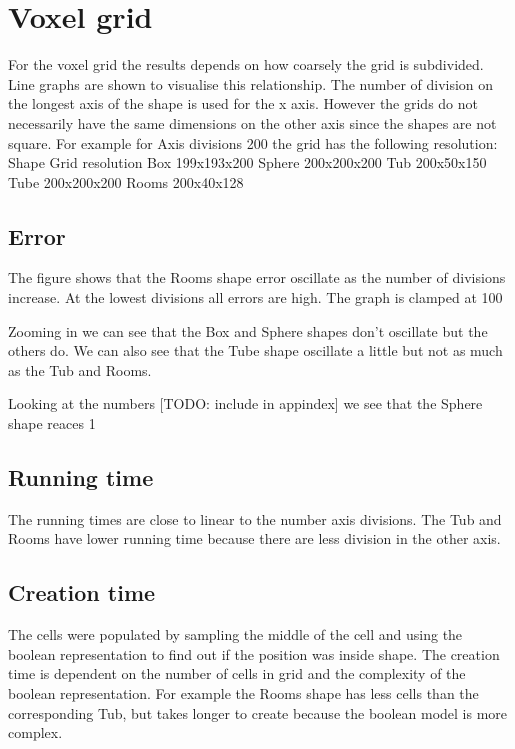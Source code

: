 \documentclass[11pt,twoside,a4paper]{report}
\begin{document}
\section{Voxel grid}
For the voxel grid the results depends on how coarsely the grid is subdivided. Line graphs are shown to visualise this relationship. The number of division on the longest axis of the shape is used for the x axis. However the grids do not necessarily have the same dimensions on the other axis since the shapes are not square. For example for Axis divisions 200 the grid has the following resolution:
Shape
Grid resolution
Box
199x193x200
Sphere
200x200x200
Tub
200x50x150
Tube
200x200x200
Rooms
200x40x128

\subsection{Error}
The figure shows that the Rooms shape error oscillate as the number of divisions increase. At the lowest divisions all errors are high. The graph is clamped at 100%

Zooming in we can see that the Box and Sphere shapes don’t oscillate but the others do. We can also see that the Tube shape oscillate a little but not as much as the Tub and Rooms.

Looking at the numbers [TODO: include in appindex] we see that the Sphere shape reaces 1%

\subsection{Running time}
The running times are close to linear to the number axis divisions. The Tub and Rooms have lower running time because there are less division in the other axis.

\subsection{Creation time}
The cells were populated by sampling the middle of the cell and using the boolean representation to find out if the position was inside shape. The creation time is dependent on the number of cells in grid and the complexity of the boolean representation. For example the Rooms shape has less cells than the corresponding Tub, but takes longer to create because the boolean model is more complex.
\end{document}
